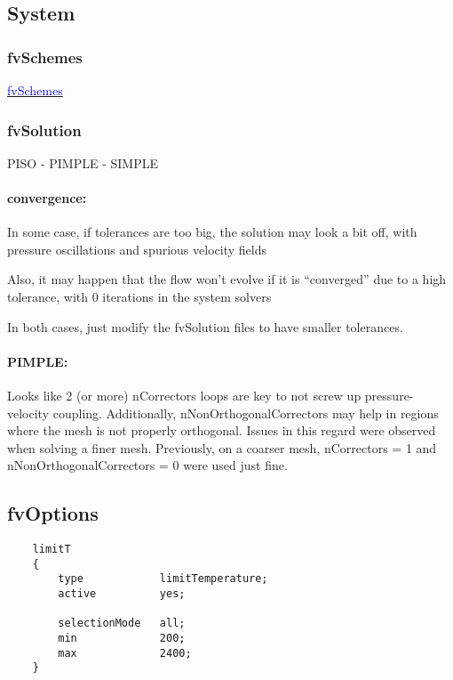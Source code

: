 \documentclass[a4paper, 12pt]{article}
\numberwithin{equation}{section}
\newcommand{\code}{\fontfamily{pcr}\selectfont}
\newcommand{\blue}[1]{\textcolor{blue}{#1}}
\begin{document}
    \subsection{System}

    \subsubsection{fvSchemes}

        \href{https://www.wolfdynamics.com/training/introOF8/supplement_tipsandtricks.pdf}{\blue{fvSchemes}}

    \subsubsection{fvSolution}

        PISO - PIMPLE - SIMPLE

        \paragraph{convergence:\\}
            In some case, if tolerances are too big, the solution may look a bit off, with pressure oscillations and spurious velocity fields

            Also, it may happen that the flow won't evolve if it is ``converged'' due to a high tolerance, with 0 iterations in the system solvers

            In both cases, just modify the {\code fvSolution} files to have smaller tolerances.

        \paragraph{PIMPLE:\\}

            Looks like 2 (or more) {\code nCorrectors} loops are key to not screw up pressure-velocity coupling. Additionally, {\code nNonOrthogonalCorrectors} may help in regions where the mesh is not properly orthogonal. Issues in this regard were observed when solving a finer mesh. Previously, on a coarser mesh, {\code nCorrectors = 1} and {\code nNonOrthogonalCorrectors = 0} were used just fine.

    \subsection{fvOptions}

    \begin{minipage}{\textwidth}
    {
    \begin{verbatim}
    limitT
    {
        type            limitTemperature;
        active          yes;

        selectionMode   all;
        min             200;
        max             2400;
    }
    \end{verbatim}
    }
    \end{minipage}
\end{document}
